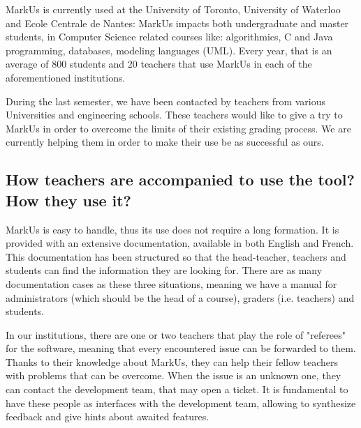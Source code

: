 \documentclass[twocolumn,10pt]{asme2e}
\begin{document}
MarkUs is currently used at the University of Toronto, University of Waterloo and Ecole Centrale de Nantes: 
MarkUs impacts both undergraduate and master students, in Computer Science related courses like: algorithmics, C and Java programming, databases, modeling languages (UML). Every year, that is an average of 800 students and 20 teachers that use MarkUs in each of the aforementioned institutions. %

During the last semester, we have been contacted by teachers from various Universities and engineering schools. These teachers would like to give a try to MarkUs in order to overcome the limits of their existing grading process. We are currently helping them in order to make their use be as successful as ours. 

\subsection*{How teachers are accompanied to use the tool? How they use it?}

MarkUs is easy to handle, thus its use does not require a long formation. It
is provided with an extensive documentation, available in both English and
French. This documentation has been structured so that the head-teacher,
teachers and students can find the information they are looking for. There are
as many documentation cases as these three situations, meaning we have a
manual for administrators (which should be the head of a course), graders
(i.e. teachers) and students. 

In our institutions, there are one or two teachers that play the role of "referees" for the software, meaning that every encountered issue can be forwarded to them. Thanks to their knowledge about MarkUs, they can help their fellow teachers with problems that can be overcome. When the issue is an unknown one, they can contact the development team, that may open a ticket. It is fundamental to have these people as interfaces with the development team, allowing to synthesize feedback and give hints about awaited features. 
\end{document}
